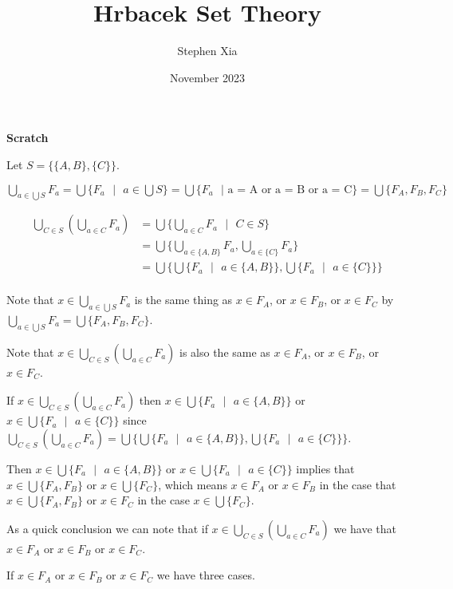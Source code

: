 \documentclass{article}
\title{Hrbacek Set Theory}
\author{Stephen Xia}
\date{November 2023}
\begin{document}
\maketitle

\medskip
\textbf{Scratch}
\medskip

Let $S = \{\{A,B\},\{C\}\}$.

\medskip
$\bigcup_{a \in \bigcup S}F_a = \bigcup\{F_a \text{ } | \text{ } a \in \bigcup S\} = \bigcup \{F_a \text{ } | \text{ a = A or a = B or a = C}\} = \bigcup \{F_A, F_B, F_C\}$ 

\medskip

\begin{align*}
    \bigcup_{C \in S}(\bigcup_{a \in C}F_a) &= \bigcup\{\bigcup_{a \in C}F_a \text{ } | \text{ } C \in S\}\\
    &= \bigcup\{\bigcup_{a \in \{A,B\}}F_a, \bigcup_{a \in \{C\}}F_a\}\\
    &= \bigcup\{\bigcup\{F_a \text{ } | \text{ } a \in \{A,B\}\}, \bigcup\{F_a \text{ } | \text{ } a \in \{C\}\}\}\\
\end{align*}

\bigskip
Note that $x \in \bigcup_{a \in \bigcup S}F_a$ is the same thing as $x \in F_A$, or $x \in F_B$, or $x \in F_C$ by $\bigcup_{a \in \bigcup S}F_a = \bigcup\{F_A, F_B, F_C\}$.

\bigskip
Note that $x \in \bigcup_{C \in S}(\bigcup_{a \in C}F_a)$ is also the same as $x \in F_A$, or $x \in F_B$, or $x \in F_C$.

If $x \in \bigcup_{C \in S}(\bigcup_{a \in C}F_a)$ then $x \in \bigcup\{F_a \text{ } | \text{ } a \in \{A,B\}\}$ or $x \in \bigcup\{F_a \text{ } | \text{ } a \in \{C\}\}$ since $\bigcup_{C \in S}(\bigcup_{a \in C}F_a) = \bigcup\{\bigcup\{F_a \text{ } | \text{ } a \in \{A,B\}\}, \bigcup\{F_a \text{ } | \text{ } a \in \{C\}\}\}$.

\medskip
Then $x \in \bigcup\{F_a \text{ } | \text{ } a \in \{A,B\}\}$ or $x \in \bigcup\{F_a \text{ } | \text{ } a \in \{C\}\}$ implies that $x \in \bigcup\{F_A, F_B\}$ or $x \in \bigcup\{F_C\}$, which means $x \in F_A$ or $x \in F_B$ in the case that $x \in \bigcup\{F_A, F_B\}$ or $x \in F_C$ in the case $x \in \bigcup\{F_C\}$.

\medskip
As a quick conclusion we can note that if $x \in \bigcup_{C \in S}(\bigcup_{a \in C}F_a)$ we have that $x \in F_A$ or $x \in F_B$ or $x \in F_C$.

\medskip
If $x \in F_A$ or $x \in F_B$ or $x \in F_C$ we have three cases.
\end{document}
